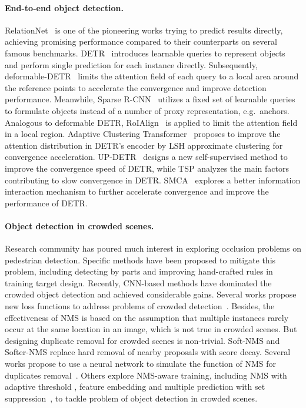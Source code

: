 \documentclass[final]{cvpr}
\begin{document}
\paragraph{End-to-end object detection.}

RelationNet~\cite{hu2018relation} is one of the pioneering works trying to predict results directly, achieving promising performance compared to their counterparts on several famous benchmarks. DETR~\cite{carion2020end}  introduces learnable queries to represent objects and perform single prediction for each instance directly. Subsequently, deformable-DETR~\cite{zhu2021deformable}  limits the attention field of each query to a local area around the reference points to accelerate the convergence and improve detection performance. Meanwhile, Sparse R-CNN~\cite{sun2020sparse}  utilizes a fixed set of learnable queries to formulate objects instead of a number of proxy representation, e.g.\ anchors. Analogous to deformable DETR, RoIAlign~\cite{he2017mask} is applied to limit the attention field in a local region. Adaptive Clustering Transformer~\cite{act2021} proposes to improve the attention distribution in DETR’s encoder by LSH approximate clustering for convergence acceleration. UP-DETR~\cite{up2021detr} designs a new self-supervised method to improve the convergence speed of DETR, while TSP\cite{sun2020tsp} analyzes the main factors contributing to slow convergence in DETR. SMCA~\cite{fastCdetr} explores a better information interaction mechanism to further accelerate convergence and improve the performance of DETR.

\vspace{-0.5cm}
\paragraph{Object detection in crowded scenes.}

Research community has poured much interest in exploring occlusion problems on pedestrian detection. Specific methods have been proposed to mitigate this problem, including detecting by parts \cite{lu2019semantic, chi2020pedhunter, chi2020relational, zhang2019double,zhang2018occlusion} and improving hand-crafted rules in training target design. Recently, CNN-based methods have dominated the crowded object detection and achieved considerable gains. Several works propose new loss functions to address problems of crowded detection~\cite{wang2017repulsion,zhang2018occlusion}. Besides, the effectiveness of NMS is based on the assumption that multiple instances rarely occur at the same location in an image, which is not true in crowded scenes. But designing duplicate removal for crowded scenes is non-trivial. Soft-NMS \cite{bodla2017soft} and Softer-NMS \cite{he2018softer} replace hard removal of nearby proposals with score decay. Several works propose to use a neural network to simulate the function of NMS for duplicates removal~\cite{gossipnet, qi2018sequential}. Others explore NMS-aware training, including NMS with adaptive threshold \cite{hosang2016a,liu2019adaptive}, feature embedding \cite{salscheider2021featurenms} and multiple prediction with set suppression~\cite{chu2020detection, huang2020nms}, to tackle problem of object detection in crowded scenes.
\end{document}
